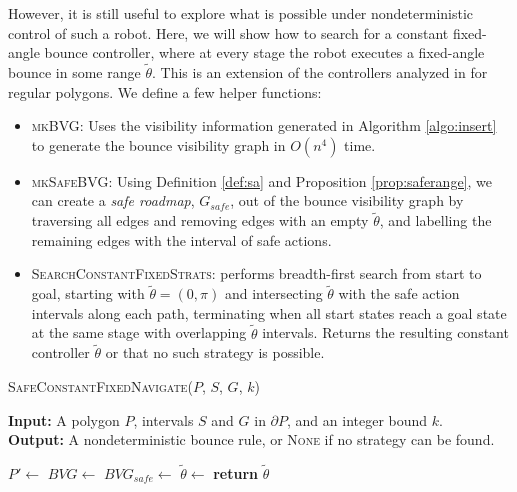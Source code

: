 \documentclass[]{styles/svproc}  %
\begin{document}
\vspace{1em}

However, it is still useful to explore what is possible under nondeterministic
control of such a robot. Here, we will show how to
search for a constant fixed-angle bounce controller, where at every stage the
robot executes a fixed-angle bounce in some range $\tilde{\theta}$. This is an
extension of the controllers analyzed in \cite{NilBecLav17} for regular polygons.
We define a few helper functions:

\begin{itemize}
\item \textsc{mkBVG}: Uses the visibility information generated in Algorithm
\ref{algo:insert} to generate the bounce visibility graph in $O(n^4)$ time.
\item \textsc{mkSafeBVG}: Using Definition \ref{def:sa} and Proposition \ref{prop:saferange}, we can create a \emph{safe roadmap}, $G_{safe}$,
        out of the bounce visibility graph by traversing all edges and removing edges with an 
        empty $\tilde{\theta}$, and labelling the remaining edges with the interval 
        of safe actions.
\item \textsc{SearchConstantFixedStrats}: performs breadth-first search from
start to goal, starting with $\tilde{\theta} = (0, \pi)$ and intersecting
$\tilde{\theta}$ with the safe action intervals along each path, terminating
when all start states reach a goal state at the same stage with overlapping
$\tilde{\theta}$ intervals. Returns the resulting constant controller $\tilde{\theta}$ or that
no such strategy is possible.
\end{itemize}

\begin{algorithm}
\caption{\textsc{SafeConstantFixedNavigate}($P$, $S$, $G$, $k$)}
\label{algo:nav}
\hspace*{\algorithmicindent} \textbf{Input:} A polygon $P$, intervals $S$ and
$G$ in $\partial P$, and an integer bound $k$.\\
\hspace*{\algorithmicindent} \textbf{Output:} A nondeterministic bounce rule,
or \textsc{None} if no strategy can be found.
\begin{algorithmic}[1]
\State $P' \gets$ 
\State $BVG \gets$ 
\State $BVG_{safe} \gets$ 
\State $\tilde{\theta} \gets$ 
\State \textbf{return} $\tilde{\theta}$
\end{algorithmic}
\end{algorithm}
\end{document}
